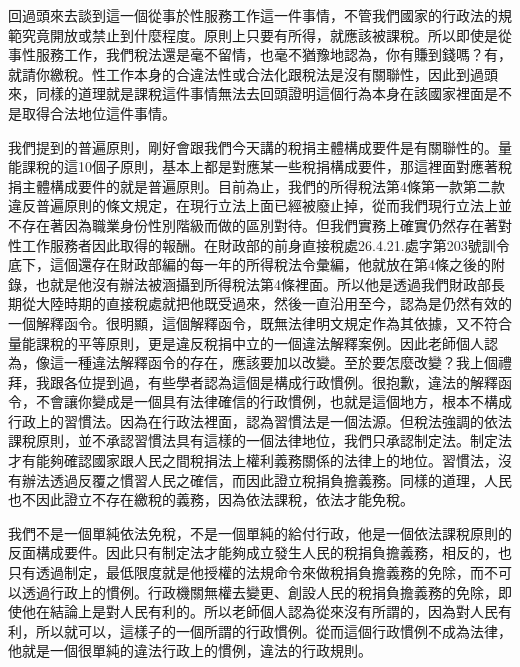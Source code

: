 \documentclass[]{ctexbook}
\begin{document}
回過頭來去談到這一個從事於性服務工作這一件事情，不管我們國家的行政法的規範究竟開放或禁止到什麼程度。原則上只要有所得，就應該被課稅。所以即使是從事性服務工作，我們稅法還是毫不留情，也毫不猶豫地認為，你有賺到錢嗎？有，就請你繳稅。性工作本身的合違法性或合法化跟稅法是沒有關聯性，因此到過頭來，同樣的道理就是課稅這件事情無法去回頭證明這個行為本身在該國家裡面是不是取得合法地位這件事情。

我們提到的普遍原則，剛好會跟我們今天講的稅捐主體構成要件是有關聯性的。量能課稅的這10個子原則，基本上都是對應某一些稅捐構成要件，那這裡面對應著稅捐主體構成要件的就是普遍原則。目前為止，我們的所得稅法第4條第一款第二款違反普遍原則的條文規定，在現行立法上面已經被廢止掉，從而我們現行立法上並不存在著因為職業身份性別階級而做的區別對待。但我們實務上確實仍然存在著對性工作服務者因此取得的報酬。在財政部的前身直接稅處26.4.21.處字第203號訓令底下，這個還存在財政部編的每一年的所得稅法令彙編，他就放在第4條之後的附錄，也就是他沒有辦法被涵攝到所得稅法第4條裡面。所以他是透過我們財政部長期從大陸時期的直接稅處就把他既受過來，然後一直沿用至今，認為是仍然有效的一個解釋函令。很明顯，這個解釋函令，既無法律明文規定作為其依據，又不符合量能課稅的平等原則，更是違反稅捐中立的一個違法解釋案例。因此老師個人認為，像這一種違法解釋函令的存在，應該要加以改變。至於要怎麼改變？我上個禮拜，我跟各位提到過，有些學者認為這個是構成行政慣例。很抱歉，違法的解釋函令，不會讓你變成是一個具有法律確信的行政慣例，也就是這個地方，根本不構成行政上的習慣法。因為在行政法裡面，認為習慣法是一個法源。但稅法強調的依法課稅原則，並不承認習慣法具有這樣的一個法律地位，我們只承認制定法。制定法才有能夠確認國家跟人民之間稅捐法上權利義務關係的法律上的地位。習慣法，沒有辦法透過反覆之慣習人民之確信，而因此證立稅捐負擔義務。同樣的道理，人民也不因此證立不存在繳稅的義務，因為依法課稅，依法才能免稅。

我們不是一個單純依法免稅，不是一個單純的給付行政，他是一個依法課稅原則的反面構成要件。因此只有制定法才能夠成立發生人民的稅捐負擔義務，相反的，也只有透過制定，最低限度就是他授權的法規命令來做稅捐負擔義務的免除，而不可以透過行政上的慣例。行政機關無權去變更、創設人民的稅捐負擔義務的免除，即使他在結論上是對人民有利的。所以老師個人認為從來沒有所謂的，因為對人民有利，所以就可以，這樣子的一個所謂的行政慣例。從而這個行政慣例不成為法律，他就是一個很單純的違法行政上的慣例，違法的行政規則。
\end{document}
